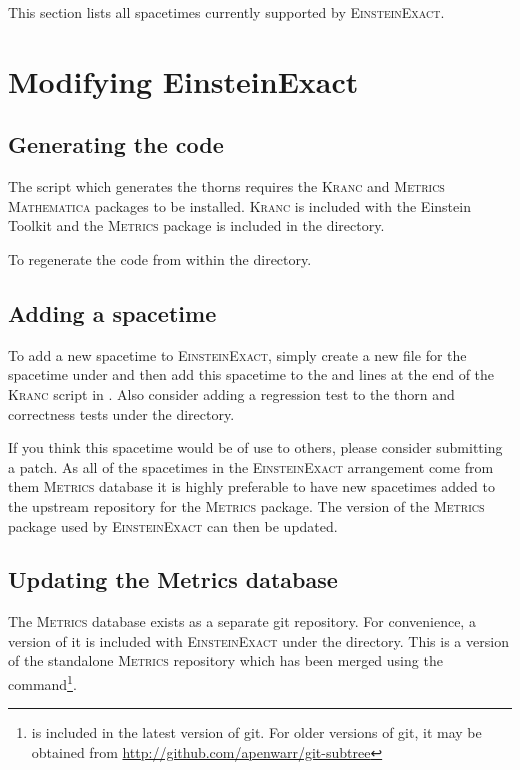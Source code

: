 \documentclass{article}
\begin{document}
This section lists all spacetimes currently supported by \textsc{EinsteinExact}.



\section{Modifying EinsteinExact}

\subsection{Generating the code}
The script which generates the thorns requires the \textsc{Kranc} and
\textsc{Metrics} \textsc{Mathematica} packages to be installed. \textsc{Kranc}
is included with the Einstein Toolkit and the \textsc{Metrics} package is
included in the  directory.

To regenerate the code  from within the  directory.

\subsection{Adding a spacetime}
To add a new spacetime to \textsc{EinsteinExact}, simply create a new file
for the spacetime under  and then add this spacetime
to the  and  lines at the end
of the \textsc{Kranc} script in . Also consider adding
a regression test to the  thorn and correctness tests
under the  directory.

If you think this spacetime would be of use to others, please consider 
submitting a patch. As all of the spacetimes in the \textsc{EinsteinExact}
arrangement come from them \textsc{Metrics} database it is highly preferable to
have new spacetimes added to the upstream repository for the \textsc{Metrics}
package. The version of the \textsc{Metrics} package used by
\textsc{EinsteinExact} can then be updated.

\subsection{Updating the Metrics database}
The \textsc{Metrics} database exists as a separate git repository. For
convenience, a version of it is included with \textsc{EinsteinExact} under
the  directory. This is a version of the standalone
\textsc{Metrics} repository which has been merged using the 
command\footnote{ is included in the latest version of git.
For older versions of git, it may be obtained from
\url{http://github.com/apenwarr/git-subtree}}.
\end{document}
